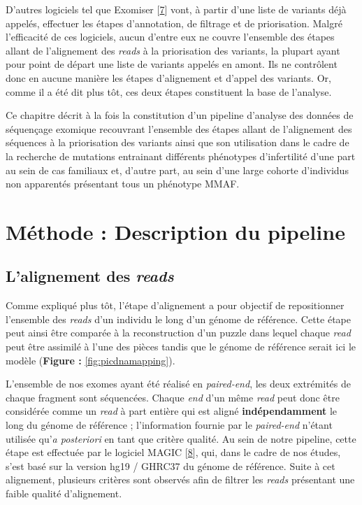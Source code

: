 \documentclass[12pt,a4paper,twoside]{ugathesis}
\begin{document}
D'autres logiciels tel que Exomiser
{[}\protect\hyperlink{ref-Robinson2014}{7}{]} vont, à partir d'une liste
de variants déjà appelés, effectuer les étapes d'annotation, de filtrage
et de priorisation. Malgré l'efficacité de ces logiciels, aucun d'entre
eux ne couvre l'ensemble des étapes allant de l'alignement des
\emph{reads} à la priorisation des variants, la plupart ayant pour point
de départ une liste de variants appelés en amont. Ils ne contrôlent donc
en aucune manière les étapes d'alignement et d'appel des variants. Or,
comme il a été dit plus tôt, ces deux étapes constituent la base de
l'analyse.

Ce chapitre décrit à la fois la constitution d'un pipeline d'analyse des
données de séquençage exomique recouvrant l'ensemble des étapes allant
de l'alignement des séquences à la priorisation des variants ainsi que
son utilisation dans le cadre de la recherche de mutations entrainant
différents phénotypes d'infertilité d'une part au sein de cas familiaux
et, d'autre part, au sein d'une large cohorte d'individus non apparentés
présentant tous un phénotype MMAF.

\newpage

\section{Méthode : Description du
pipeline}\label{methode-description-du-pipeline}

\subsection{\texorpdfstring{L'alignement des
\emph{reads}}{L'alignement des reads}}\label{lalignement-des-reads}

Comme expliqué plus tôt, l'étape d'alignement a pour objectif de
repositionner l'ensemble des \emph{reads} d'un individu le long d'un
génome de référence. Cette étape peut ainsi être comparée à la
reconstruction d'un puzzle dans lequel chaque \emph{read} peut être
assimilé à l'une des pièces tandis que le génome de référence serait ici
le modèle (\textbf{Figure : }\ref{fig:picdnamapping}).

L'ensemble de nos exomes ayant été réalisé en \emph{paired-end}, les
deux extrémités de chaque fragment sont séquencées. Chaque \emph{end}
d'un même \emph{read} peut donc être considérée comme un \emph{read} à
part entière qui est aligné \textbf{indépendamment} le long du génome de
référence ; l'information fournie par le \emph{paired-end} n'étant
utilisée qu'\emph{a posteriori} en tant que critère qualité. Au sein de
notre pipeline, cette étape est effectuée par le logiciel MAGIC
{[}\protect\hyperlink{ref-Su2014}{8}{]}, qui, dans le cadre de nos
études, s'est basé sur la version hg19 / GHRC37 du génome de référence.
Suite à cet alignement, plusieurs critères sont observés afin de filtrer
les \emph{reads} présentant une faible qualité d'alignement.
\end{document}
